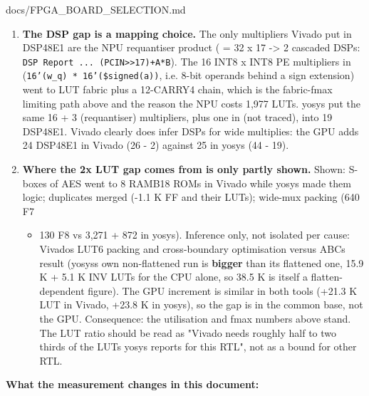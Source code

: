 \begin{relocated}{docs/FPGA_BOARD_SELECTION.md}
\begin{enumerate}
  Only the totals are meaningful.)
\item
  \textbf{The DSP gap is a mapping choice.} The only multipliers Vivado
  put in DSP48E1 are the NPU requantiser product ( = 32 x
  17 -\textgreater{} 2 cascaded DSPs:
  \texttt{DSP\ Report\ .\allowbreak{}.\allowbreak{}.\allowbreak{}\ (PCIN>>17)+\allowbreak{}A*B}).
  The 16 INT8 x INT8 PE multipliers in 
  (\texttt{16'(w\_\allowbreak{}q)\ *\ 16'(\$signed(a))}, i.e. 8-bit
  operands behind a sign extension) went to LUT fabric plus a 12-CARRY4
  chain, which is the fabric-fmax limiting path above and the reason the
  NPU costs 1,977 LUTs. yosys put the same 16 + 3 (requantiser)
  multipliers, plus one in  (not traced), into 19
  DSP48E1. Vivado clearly does infer DSPs for wide multiplies: the GPU
  adds 24 DSP48E1 in Vivado (26 - 2) against 25 in yosys (44 - 19).
\item
  \textbf{Where the 2x LUT gap comes from is only partly shown.} Shown:
  S-boxes of AES went to 8 RAMB18 ROMs in Vivado while yosys
   made them logic; duplicates merged (-1.1 K FF and
  their LUTs); wide-mux packing (640 F7

  \begin{itemize}
  \tightlist
  \item
    130 F8 vs 3,271 + 872 in yosys). Inference only, not isolated per
    cause: Vivado\textquotesingle s LUT6 packing and cross-boundary
    optimisation versus ABC\textquotesingle s  result
    (yosys\textquotesingle s own non-flattened run is \textbf{bigger}
    than its flattened one, 15.9 K + 5.1 K INV LUTs for the CPU alone,
    so 38.5 K is itself a flatten-dependent figure). The GPU increment
    is similar in both tools (+21.3 K LUT in Vivado, +23.8 K in yosys),
    so the gap is in the common base, not the GPU. Consequence: the
    utilisation and fmax numbers above stand. The LUT ratio should be
    read as "Vivado needs roughly half to two thirds of the LUTs yosys
    reports for this RTL", not as a bound for other RTL.
  \end{itemize}
\end{enumerate}

\textbf{What the measurement changes in this document:}


\end{relocated}
